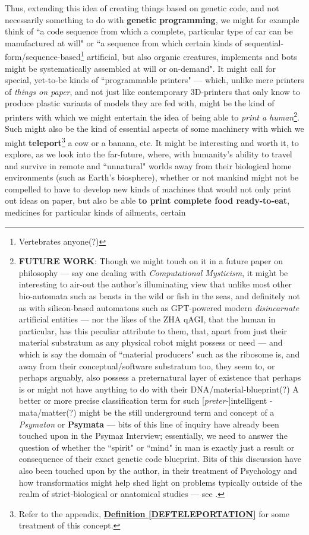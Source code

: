\documentclass[a4paper, 18pt]{book} %
\begin{document}
Thus, extending this idea of creating things based on genetic code, and not necessarily something to do with \textbf{genetic programming}, we might for example think of ``a code sequence from which a complete, particular type of car can be manufactured at will" or ``a sequence from which certain kinds of sequential-form/sequence-based\footnote{Vertebrates anyone(?)} artificial, but also organic creatures, implements and bots might be systematically assembled at will or on-demand". It might call for special, yet-to-be kinds of ``programmable printers" --- which, unlike mere printers of \textit{things on paper}, and not just like contemporary 3D-printers that only know to produce plastic variants of models they are fed with, might be the kind of printers with which we might entertain the idea of being able to \textit{print a human}\footnote{\textbf{FUTURE WORK}: Though we might touch on it in a future paper on philosophy --- say one dealing with \textit{Computational Mysticism}\cite{lutalo2024mysticism}, it might be interesting to air-out the author's illuminating view that unlike most other bio-automata such as beasts in the wild or fish in the seas, and definitely not as with silicon-based automatons such as GPT-powered modern \textit{disincarnate} artificial entities --- nor the likes of the ZHA qAGI\cite{jwlzha}, that the human in particular, has this peculiar attribute to them, that, apart from just their material substratum as any physical robot might possess or need --- and which is say the domain of ``material producers" such as the ribosome is, and away from their conceptual/software substratum too, they seem to, or perhaps arguably, also possess a preternatural layer of existence that perhaps is or might not have anything to do with their DNA/material-blueprint(?) A better or more precise classification term for such [\textit{preter-}]intelligent -mata/matter(?) might be the still underground term and concept of a \textit{Psymaton} or \textbf{Psymata} --- bits of this line of inquiry have already been touched upon in the Psymaz Interview\cite{lutalo2025unraveling}; essentially, we need to answer the question of whether the ``spirit" or ``mind" in man is exactly just a result or consequence of their exact genetic code blueprint. Bits of this discussion have also been touched upon by the author, in their treatment of Psychology and how transformatics might help shed light on problems typically outside of the realm of strict-biological or anatomical studies --- see \cite{Lutalo2025transpsy}.}. Such might also be the kind of essential aspects of some machinery with which we might \textbf{teleport}\footnote{Refer to the appendix, \textbf{\hyperref[DEFTELEPORTATION]{Definition \ref{DEFTELEPORTATION}}} for some treatment of this concept.} a cow or a banana, etc. It might be interesting and worth it, to explore, as we look into the far-future, where, with humanity's ability to travel and survive in remote and ``unnatural" worlds away from their biological home environments (such as Earth's biosphere), whether or not mankind might not be compelled to have to develop new kinds of machines that would not only print out ideas on paper, but also be able \textbf{to print complete food ready-to-eat}, medicines for particular kinds of ailments, certain 
\end{document}
